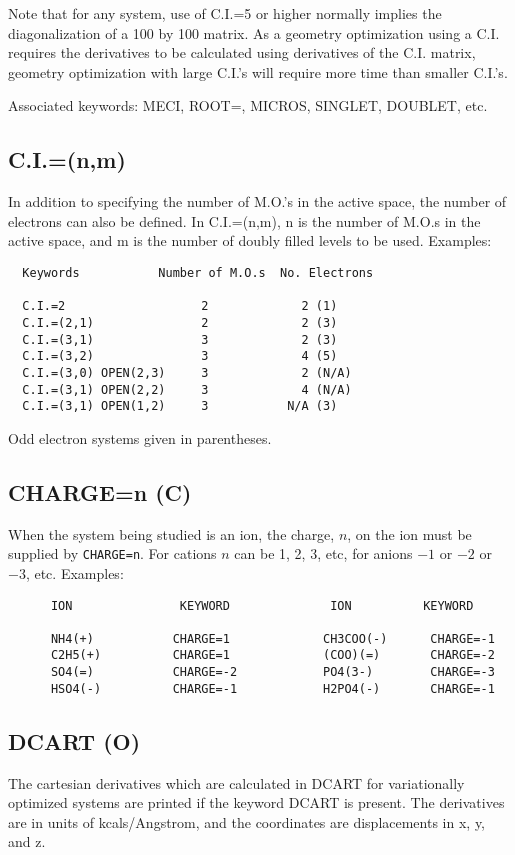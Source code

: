 \documentclass[11pt]{book}
\newcommand{\mi}[1]{#1\index{#1}}
\begin{document}
    Note that for any system, use of C.I.=5 or higher  normally  implies
the  diagonalization  of a 100 by 100 matrix.  As a geometry optimization
using a C.I. requires the derivatives to be calculated using  derivatives
of  the C.I. matrix, geometry optimization with large C.I.'s will require
more time than smaller C.I.'s.

Associated keywords:  MECI, ROOT=, MICROS, SINGLET, DOUBLET, etc.
                                          
\subsection*{C.I.=(n,m)}
    In addition to specifying the number of M.O.'s in the active  space,
the  number  of  electrons  can also be defined.  In C.I.=(n,m), n is the
number of M.O.s in the active space, and m is the number of doubly filled
levels to be used.
Examples:
\begin{verbatim}
  Keywords           Number of M.O.s  No. Electrons

  C.I.=2                   2             2 (1)
  C.I.=(2,1)               2             2 (3)
  C.I.=(3,1)               3             2 (3)
  C.I.=(3,2)               3             4 (5)
  C.I.=(3,0) OPEN(2,3)     3             2 (N/A)
  C.I.=(3,1) OPEN(2,2)     3             4 (N/A)
  C.I.=(3,1) OPEN(1,2)     3           N/A (3)
\end{verbatim}
Odd electron systems given in parentheses.

\subsection*{CHARGE=n (C)}
 When the system being studied is an ion, the charge, $n$, on  the  ion
 must be supplied by \verb/CHARGE=n/.  For cations $n$ can be 1, 2, 3, etc, 
 for anions $-1$ or $-2$ or $-3$, etc.
 Examples:
\begin{verbatim}
      ION               KEYWORD              ION          KEYWORD

      NH4(+)           CHARGE=1             CH3COO(-)      CHARGE=-1
      C2H5(+)          CHARGE=1             (COO)(=)       CHARGE=-2
      SO4(=)           CHARGE=-2            PO4(3-)        CHARGE=-3
      HSO4(-)          CHARGE=-1            H2PO4(-)       CHARGE=-1
\end{verbatim}

\subsection*{DCART (O)}
 The  cartesian  derivatives  which  are  calculated  in \mi{DCART}   for
 variationally  optimized  systems  are  printed  if  the keyword DCART is
 present.  The  derivatives  are  in  units  of  kcals/Angstrom,  and  the
 coordinates are displacements in x, y, and z.
\end{document}
